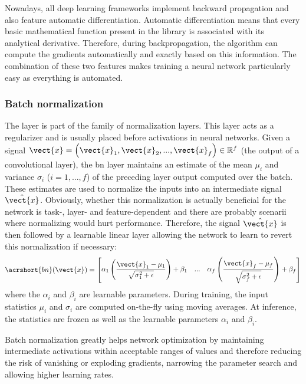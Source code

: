 Nowadays, all deep learning frameworks implement backward propagation and also
feature automatic differentiation. Automatic differentiation means that every
basic mathematical function present in the library is associated with its analytical
derivative. Therefore, during backpropagation, the algorithm can compute the
gradients automatically and exactly based on this information. The combination of
these two features makes training a neural network particularly easy as everything
is automated.

\subsubsection{Batch normalization}
\label{sssec:backml:batchnorm}

The  \cite{ioffe2015batch} layer is part of the family of
normalization layers. This layer acts as a regularizer and is usually placed before
activations in neural networks. Given a signal
$\vect{x} = \left(\vect{x}_1, \vect{x}_2, ..., \vect{x}_f\right) \in \mathbb{R}^f$
(\eg the output of a convolutional layer), the \acrshort{bn} layer maintains an
estimate of the mean $\mu_i$ and variance $\sigma_i$ ($i = 1, ..., f$) of the
preceding layer output computed over the batch. These estimates are used to
normalize the inputs into an intermediate signal $\hat{\vect{x}}$. Obviously,
whether this normalization is actually beneficial for the network is task-, layer-
and feature-dependent and there are probably scenarii where normalizing would hurt
performance. Therefore, the signal $\hat{\vect{x}}$ is then followed by a learnable
linear layer allowing the network to learn to revert this normalization if
necessary:
\begin{equation}
\label{eqn:backml:bn}
\acrshort{bn}(\vect{x}) = \begin{bmatrix}
\alpha_1 \left(\dfrac{\vect{x}_1 - \mu_1}{\sqrt{\sigma^2_1 + \epsilon}}\right) + \beta_1 & ... & \alpha_f \left(\dfrac{\vect{x}_f - \mu_f}{\sqrt{\sigma^2_f + \epsilon}}\right) + \beta_f \\
\end{bmatrix}\end{equation}
where the $\alpha_i$ and $\beta_i$ are learnable parameters. During training,
the input statistics $\mu_i$ and $\sigma_i$ are computed on-the-fly using moving
averages. At inference, the statistics are frozen as well as the learnable parameters
$\alpha_i$ and $\beta_i$.

Batch normalization greatly helps network optimization by maintaining intermediate
activations within acceptable ranges of values and therefore reducing the risk of
vanishing or exploding gradients, narrowing the parameter search and allowing
higher learning rates.

